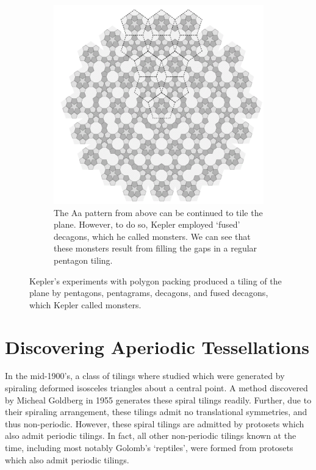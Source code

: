 \documentclass[
  oneside,
  11pt, a4paper,
  footinclude=true,
  headinclude=true,
  cleardoublepage=empty
]{scrbook}
\begin{document}
\begin{figure}[H]
        ~ %
        \begin{subfigure}[b]{0.9\textwidth}
                \includegraphics[width=\textwidth]{Monsters}
                \caption{The Aa pattern from above can be continued to tile the plane. However, to do so, Kepler employed `fused' decagons, which he called monsters. We can see that these monsters result from filling the gaps in a regular pentagon tiling. \cite{CraigKaplan}}
                \label{fig:tilingmonsters}
        \end{subfigure}\hfill
         \caption[Kepler's Experiments with Monsters]{Kepler's experiments with polygon packing produced a tiling of the plane by pentagons, pentagrams, decagons, and fused decagons, which Kepler called monsters.}
         \label{fig:Monsters}
\end{figure}

\section{Discovering Aperiodic Tessellations} %
In the mid-1900's, a class of tilings where studied which were generated by spiraling deformed isosceles triangles about a central point. A method discovered by Micheal Goldberg in 1955 generates these spiral tilings readily. Further, due to their spiraling arrangement, these tilings admit no translational symmetries, and thus non-periodic. However, these spiral tilings are admitted by protosets which also admit periodic tilings. In fact, all other non-periodic tilings known at the time, including most notably Golomb's `reptiles', were formed from protosets which also admit periodic tilings.
\end{document}
